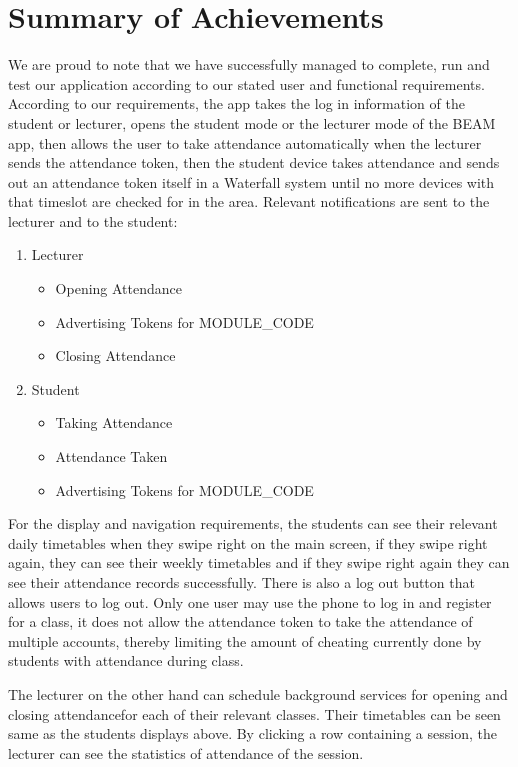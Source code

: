 \documentclass[../report.tex]{subfiles}
\begin{document}
\section{Summary of Achievements}
We are proud to note that we have successfully managed to complete, run and test our application according to our stated user and functional requirements. According to our requirements, the app takes the log in information of the student or lecturer, opens the student mode or the lecturer mode of the BEAM app, then allows the user to take attendance automatically when the lecturer sends the attendance token, then the student device takes attendance and sends out an attendance token itself in a Waterfall system until no more devices with that timeslot are checked for in the area. Relevant notifications are sent to the lecturer and to the student:
\begin{enumerate}
\item Lecturer
\begin{itemize}
\item Opening Attendance
\item Advertising Tokens for MODULE\_CODE
\item Closing Attendance
\end{itemize}
\item Student
\begin{itemize}
\item Taking Attendance
\item Attendance Taken
\item Advertising Tokens for MODULE\_CODE
\end{itemize}
\end{enumerate}

For the display and navigation requirements, the students can see their relevant daily timetables when they swipe right on the main screen, if they swipe right again, they can see their weekly timetables and if they swipe right again they can see their attendance records successfully. There is also a log out button that allows users to log out. Only one user may use the phone to log in and register for a class, it does not allow the attendance token to take the attendance of multiple accounts, thereby limiting the amount of cheating currently done by students with attendance during class. 

The lecturer on the other hand can schedule background services for opening and closing attendancefor each of their relevant classes. Their timetables can be seen same as the students displays above. By clicking a row containing a session, the lecturer can see the statistics of attendance of the session.
\end{document}
